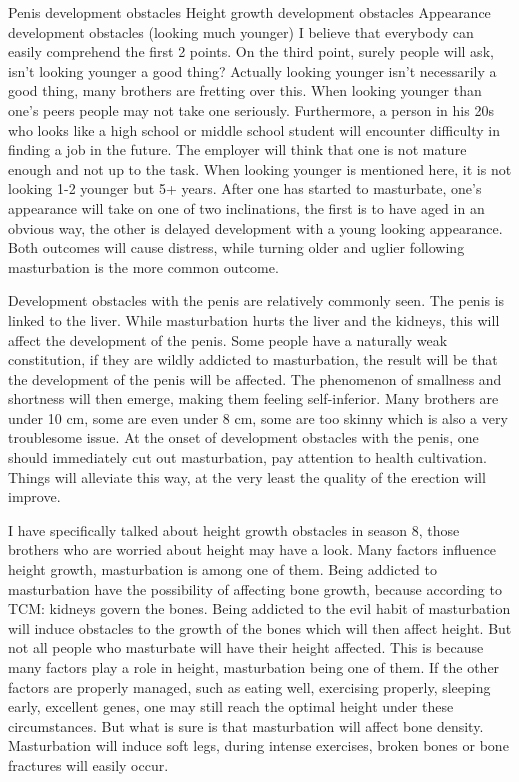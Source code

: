 \documentclass[
]{book}
\begin{document}
Penis development obstacles
Height growth development obstacles
Appearance development obstacles (looking much younger)
I believe that everybody can easily comprehend the first 2 points. On the third point, surely people will ask, isn't looking younger a good thing? Actually looking younger isn't necessarily a good thing, many brothers are fretting over this. When looking younger than one's peers people may not take one seriously. Furthermore, a person in his 20s who looks like a high school or middle school student will encounter difficulty in finding a job in the future. The employer will think that one is not mature enough and not up to the task. When looking younger is mentioned here, it is not looking 1-2 younger but 5+ years. After one has started to masturbate, one's appearance will take on one of two inclinations, the first is to have aged in an obvious way, the other is delayed development with a young looking appearance. Both outcomes will cause distress, while turning older and uglier following masturbation is the more common outcome.

Development obstacles with the penis are relatively commonly seen. The penis is linked to the liver. While masturbation hurts the liver and the kidneys, this will affect the development of the penis. Some people have a naturally weak constitution, if they are wildly addicted to masturbation, the result will be that the development of the penis will be affected. The phenomenon of smallness and shortness will then emerge, making them feeling self-inferior. Many brothers are under 10 cm, some are even under 8 cm, some are too skinny which is also a very troublesome issue. At the onset of development obstacles with the penis, one should immediately cut out masturbation, pay attention to health cultivation. Things will alleviate this way, at the very least the quality of the erection will improve.

I have specifically talked about height growth obstacles in season 8, those brothers who are worried about height may have a look. Many factors influence height growth, masturbation is among one of them. Being addicted to masturbation have the possibility of affecting bone growth, because according to TCM: kidneys govern the bones. Being addicted to the evil habit of masturbation will induce obstacles to the growth of the bones which will then affect height. But not all people who masturbate will have their height affected. This is because many factors play a role in height, masturbation being one of them. If the other factors are properly managed, such as eating well, exercising properly, sleeping early, excellent genes, one may still reach the optimal height under these circumstances. But what is sure is that masturbation will affect bone density. Masturbation will induce soft legs, during intense exercises, broken bones or bone fractures will easily occur.
\end{document}
